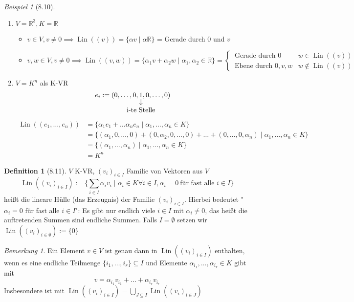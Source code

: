 \documentclass[a4paper]{scrartcl}
\DeclareMathOperator{\Forall}{\forall}
\DeclareMathOperator{\Lin}{Lin}
\theoremstyle{definition}
\newtheorem{defn}{Definition}
\theoremstyle{plain}
\theoremstyle{plain}
\theoremstyle{remark}
\newtheorem{remark}{Bemerkung}
\theoremstyle{remark}
\theoremstyle{remark}
\theoremstyle{remark}
\theoremstyle{remark}
\newtheorem{ex}{Beispiel}
\begin{document}
\begin{ex}[8.10]
\mbox{}
\begin{enumerate}
\item $V = \mathbb{R}^3, K = \mathbb{R}$
\begin{itemize}
\item $v \in V, v \neq 0 \implies \Lin((v)) = \{\alpha v \mid \alpha \mathbb{R}\}$ = Gerade durch $0$ und $v$
\item \[v,w \in V, v \neq 0 \implies \Lin((v,w)) = \{\alpha_1 v + \alpha_2 w \mid \alpha_1, \alpha_2 \in \mathbb{R}\} = \begin{cases} ~\text{Gerade durch $0$} & w \in \Lin((v)) \\ ~\text{Ebene durch $0,v,w$} & w\not\in \Lin((v)) \end{cases}\]
\end{itemize}
\item $V = K^n$ als K-VR \\
     \[e_i := (0, \ldots, 0, \underarrow[1]{i-te Stelle}, 0, \ldots, 0)\]
\begin{align*}
\Lin((e_1, \ldots, e_n)) &= \{\alpha_1 e_1 + \ldots \alpha_n e_n \mid \alpha_1, \ldots, \alpha_n \in K \} \\
&= \{(\alpha_1, 0, \ldots, 0) + (0, \alpha_2, 0, \ldots, 0) + \ldots + (0, \ldots, 0, \alpha_n) \mid \alpha_1, \ldots, \alpha_n \in K\} \\
&= \{(\alpha_1, \ldots, \alpha_n) \mid \alpha_1, \ldots, \alpha_n \in K\} \\
&= K^n
\end{align*}
\end{enumerate}
\end{ex}
\begin{defn}[8.11]
$V$ K-VR, $(v_i)_{i\in I}$ Familie von Vektoren aus $V$
\[\Lin((v_i)_{i \in I}) := \{\sum_{i\in I} \alpha_i v_i \mid \alpha_i \in K \Forall i\in I, \alpha_i = 0 ~\text{für fast alle $i\in I$}\}\]
heißt die lineare Hülle (das Erzeugnis) der Familie $(v_i)_{i \in I}$. Hierbei bedeutet "$\alpha_i = 0$ für fast alle $i\in I$": Es gibt nur endlich viele $i\in I$ mit $\alpha_i \neq 0$,
das heißt die auftretenden Summen sind endliche Summen. Falls $I = \emptyset$ setzen wir $\Lin((v_i)_{i\in\emptyset}) := \{0\}$
\end{defn}
\begin{remark}
Ein Element $v \in V$ ist genau dann in $\Lin((v_i)_{i\in I})$ enthalten, wenn es eine endliche Teilmenge $\{i_1, \ldots, i_r\} \subseteq I$ und Elemente $\alpha_{i_1}, \ldots, \alpha_{i_r} \in K$ gibt mit
\[v = \alpha_{i_1} v_{i_1} + \ldots + \alpha_{i_r} v_{i_r}\]
Insbesondere ist mit $\Lin((v_i)_{i\in I}) = \bigcup_{J\subseteq I} \Lin((v_i)_{i\in J})$
\end{remark}
\end{document}
